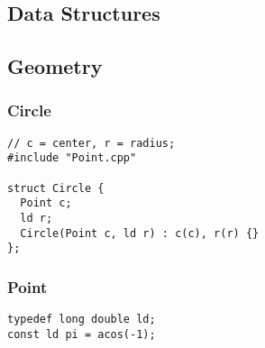 \documentclass[twoside]{article}
\begin{document}
\begin{multicols*}{2}
\sectionfont{\bfseries\sffamily\centering\Huge}
\vspace{1em}
\section*{Data Structures}
\vspace{3em}
\subsectionfont{\bfseries\sffamily\centering\LARGE}
\vspace{0em}
\subsection*{Geometry}
\vspace{2em}
\subsubsectionfont{\large\bfseries\sffamily\underline}
\subsubsection*{Circle}
\begin{verbatim}
// c = center, r = radius;
#include "Point.cpp"

struct Circle {
  Point c;
  ld r;
  Circle(Point c, ld r) : c(c), r(r) {}
};
\end{verbatim}

\subsubsectionfont{\large\bfseries\sffamily\underline}
\subsubsection*{Point}
\begin{verbatim}
typedef long double ld;
const ld pi = acos(-1);


\end{verbatim}
\end{multicols*}
\end{document}
